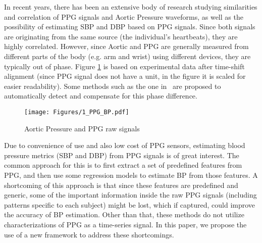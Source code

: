\documentclass[letterpaper, 10 pt, conference]{ieeeconf}
\begin{document}
In recent years, there has been an extensive body of research studying similarities and correlation of PPG signals and Aortic Pressure waveforms, as well as the possibility of estimating SBP and DBP based on PPG signals.
Since both signals are originating from the same source (the individual's heartbeats), they are highly correlated. However, since Aortic and PPG are generally measured from different parts of the body (e.g. arm and wrist) using different devices, they are typically out of phase. Figure \ref{fig: PPG_BP_Cor} is based on experimental data after time-shift alignment (since PPG signal does not have a unit, in the figure it is scaled for easier readability). Some methods such as the one in~\cite{xing2016optical} are proposed to automatically detect and compensate for this phase difference. 
\begin{figure}[b]
    \centering
    \vspace{-4.5ex}
    \texttt{[image: Figures/1\_PPG\_BP.pdf]}
    \caption{Aortic Pressure and PPG raw signals}
    \vspace{-1ex}
    \label{fig: PPG_BP_Cor}
\end{figure}
%

Due to convenience of use and also low cost of PPG sensors, estimating blood pressure metrics (SBP and DBP) from PPG signals is of great interest. The common approach for this is to first extract a set of predefined features from PPG, and then use some regression models to estimate BP from those features. A shortcoming of this approach is that since these features are predefined and generic, some of the important information inside the raw PPG signals (including patterns specific to each subject) might be lost, which if captured, could improve the accuracy of BP estimation. Other than that, these methods do not utilize characterizations of PPG as a time-series signal.
In this paper, we propose the use of a new framework to address these shortcomings. 
\end{document}
